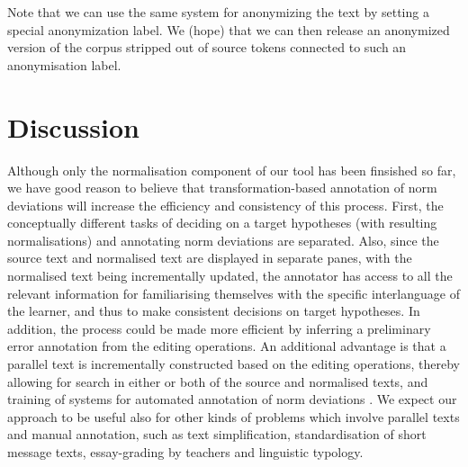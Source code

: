 \documentclass[10pt, a4paper]{article}
\newcommand{\elena}[1]{{\color{BrickRed}{Elena: #1}}}
\newcommand{\normAnn}[0]{our tool }
\begin{document}
Note that we can use the same system for anonymizing the text by setting a special anonymization label. We (hope) that we can
then release an anonymized version of the corpus stripped out of source tokens connected to such an anonymisation label.

\elena{Also something about about our intended error categories? Yes, I will add a bit on this}

\section{Discussion}
\label{sec:discussion}


Although only the normalisation component of \normAnn has been finsished so far, we have good reason to believe that transformation-based annotation of norm deviations will increase the efficiency and consistency of this process.
First, the conceptually different tasks of deciding on a target hypotheses (with resulting normalisations) and annotating norm deviations are separated. Also, since the source text and normalised text are displayed in separate panes, with the normalised text being incrementally updated, the annotator has access to all the relevant information for familiarising themselves with the specific interlanguage of the learner, and thus to make consistent decisions on target hypotheses. In addition, the process could be made more efficient by inferring a preliminary error annotation from the editing operations. An additional advantage is that a parallel text is incrementally constructed based on the editing operations, thereby allowing for search in either or both of the source and normalised texts, and training of systems for automated annotation of norm deviations \cite{sproat2016rnn}. We expect our approach to be useful also for other kinds of problems which involve parallel texts and manual annotation, such as text simplification, standardisation of short message texts, essay-grading by teachers and linguistic typology. %
\end{document}
